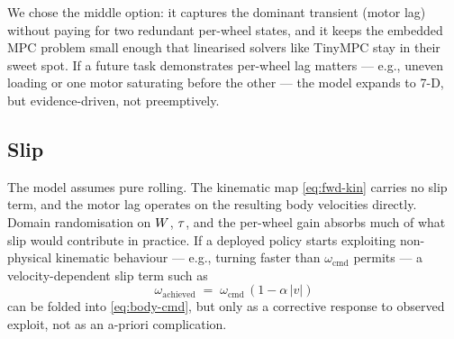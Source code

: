 We chose the middle option: it captures the dominant transient (motor lag) without paying for two redundant per-wheel states, and it keeps the embedded MPC problem small enough that linearised solvers like TinyMPC stay in their sweet spot. If a future task demonstrates per-wheel lag matters --- e.g., uneven loading or one motor saturating before the other --- the model expands to 7-D, but evidence-driven, not preemptively.

\subsection{Slip}

The model assumes pure rolling. The kinematic map \eqref{eq:fwd-kin} carries no slip term, and the motor lag operates on the resulting body velocities directly. Domain randomisation on $W$, $\tau$, and the per-wheel gain absorbs much of what slip would contribute in practice. If a deployed policy starts exploiting non-physical kinematic behaviour --- e.g., turning faster than $\omega_{\text{cmd}}$ permits --- a velocity-dependent slip term such as
\begin{equation}
    \omega_{\text{achieved}} \;=\; \omega_{\text{cmd}}\,(1 - \alpha\,|v|)
\end{equation}
can be folded into \eqref{eq:body-cmd}, but only as a corrective response to observed exploit, not as an a-priori complication.
